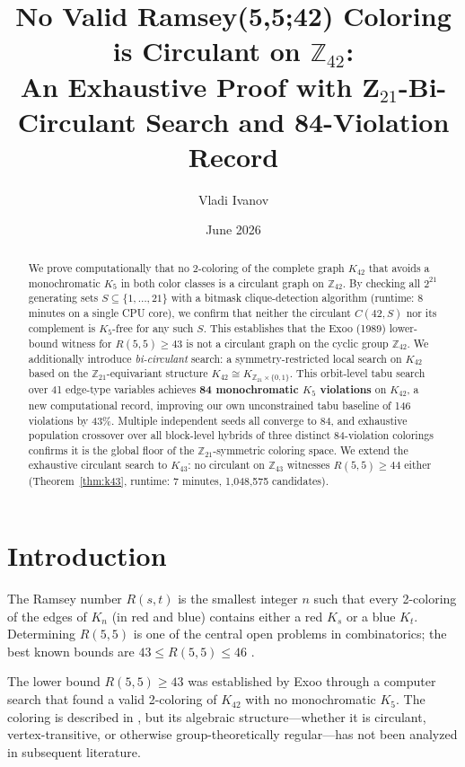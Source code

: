 \documentclass[11pt]{article}
\title{No Valid Ramsey(5,5;42) Coloring is Circulant on $\mathbb{Z}_{42}$:\\
An Exhaustive Proof with Z$_{21}$-Bi-Circulant Search and 84-Violation Record}
\author{Vladi Ivanov}
\date{June 2026}
\begin{document}
\maketitle

\begin{abstract}
We prove computationally that no 2-coloring of the complete graph $K_{42}$
that avoids a monochromatic $K_5$ in both color classes is a circulant graph on
$\mathbb{Z}_{42}$.
By checking all $2^{21}$ generating sets $S \subseteq \{1,\ldots,21\}$ with
a bitmask clique-detection algorithm (runtime: 8 minutes on a single CPU core),
we confirm that neither the circulant $C(42,S)$ nor its complement is $K_5$-free
for any such $S$.
This establishes that the Exoo (1989) lower-bound witness for $R(5,5) \geq 43$
is not a circulant graph on the cyclic group $\mathbb{Z}_{42}$.
We additionally introduce \emph{bi-circulant} search: a symmetry-restricted
local search on $K_{42}$ based on the $\mathbb{Z}_{21}$-equivariant structure
$K_{42} \cong K_{\mathbb{Z}_{21} \times \{0,1\}}$.
This orbit-level tabu search over 41 edge-type variables achieves
\textbf{84 monochromatic $K_5$ violations} on $K_{42}$,
a new computational record, improving our own unconstrained tabu baseline
of 146 violations by 43\%.
Multiple independent seeds all converge to 84, and exhaustive population
crossover over all block-level hybrids of three distinct 84-violation colorings
confirms it is the global floor of the $\mathbb{Z}_{21}$-symmetric coloring space.
We extend the exhaustive circulant search to $K_{43}$: no circulant on
$\mathbb{Z}_{43}$ witnesses $R(5,5) \geq 44$ either (Theorem~\ref{thm:k43},
runtime: 7 minutes, 1,048,575 candidates).
\end{abstract}

\section{Introduction}

The Ramsey number $R(s,t)$ is the smallest integer $n$ such that every
2-coloring of the edges of $K_n$ (in red and blue) contains either a red $K_s$
or a blue $K_t$. Determining $R(5,5)$ is one of the central open problems in
combinatorics; the best known bounds are $43 \leq R(5,5) \leq 46$
\cite{exoo1989,angeltveit2024}.

The lower bound $R(5,5) \geq 43$ was established by Exoo \cite{exoo1989}
through a computer search that found a valid 2-coloring of $K_{42}$ with no
monochromatic $K_5$. The coloring is described in \cite{exoo1989}, but its
algebraic structure---whether it is circulant, vertex-transitive, or otherwise
group-theoretically regular---has not been analyzed in subsequent literature.
\end{document}
